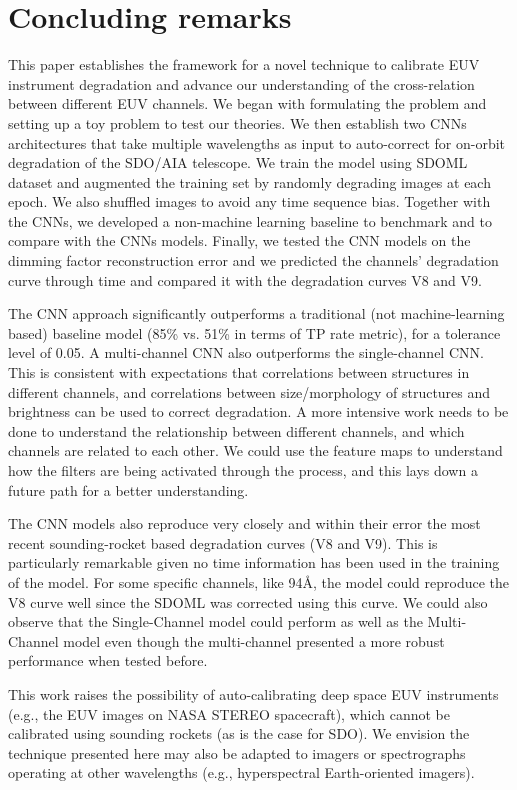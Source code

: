 \documentclass[twocolumn,usenames,dvipsnames]{aastex63}
\begin{document}
\section{Concluding remarks}
\label{section:summary}
This paper establishes the framework for a novel technique to calibrate EUV instrument degradation and advance our understanding of the cross-relation between different EUV channels. We began with formulating the problem and setting up a toy problem to test our theories. We then establish two CNNs architectures that take multiple wavelengths as input to auto-correct for on-orbit degradation of the SDO/AIA telescope. We train the model using SDOML dataset and augmented the training set by randomly degrading images at each epoch. We also shuffled images to avoid any time sequence bias. Together with the CNNs, we developed a non-machine learning baseline to benchmark and to compare with the CNNs models. Finally, we tested the CNN models on the dimming factor reconstruction error and we predicted the channels' degradation curve through time and compared it with the degradation curves V8 and V9.

The CNN approach significantly outperforms a traditional (not machine-learning based) baseline model (85\% vs. 51\% in terms of TP rate metric), for a tolerance level of 0.05. A multi-channel CNN also outperforms the single-channel CNN. This is consistent with expectations that correlations between structures in different channels, and correlations between size/morphology of structures and brightness can be used to correct degradation. A more intensive work needs to be done to understand the relationship between different channels, and which channels are related to each other. We could use the feature maps to understand how the filters are being activated through the process, and this lays down a future path for a better understanding.

The CNN models also reproduce very closely and within their error the most recent sounding-rocket based degradation curves (V8 and V9). This is particularly remarkable given no time information has been used in the training of the model. For some specific channels, like 94\AA, the model could reproduce the V8 curve well since the SDOML was corrected using this curve. We could also observe that the Single-Channel model could perform as well as the Multi-Channel model even though the multi-channel presented a more robust performance when tested before.

This work raises the possibility of auto-calibrating deep space EUV instruments (e.g., the EUV images on NASA STEREO spacecraft), which cannot be calibrated using sounding rockets (as is the case for SDO). We envision the technique presented here may also be adapted to imagers or spectrographs operating at other wavelengths (e.g., hyperspectral Earth-oriented imagers). 
\end{document}
